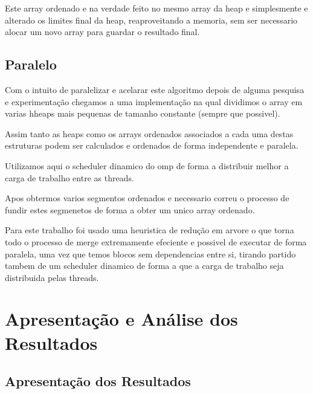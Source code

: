 \documentclass{article}
\begin{document}
\par Este array ordenado e na verdade feito no mesmo array da heap e simplesmente e alterado os limites final da heap, reaproveitando a memoria, sem ser necessario alocar um novo array para guardar o resultado final.


\subsection{Paralelo}
Com o intuito de paralelizar e acelarar este algoritmo depois de alguma pesquisa e experimentação chegamos a uma implementação na qual dividimos o array em varias hheaps mais pequenas de tamanho constante (sempre que possivel). 
\par Assim tanto as heaps como os arrays ordenados associados a cada uma destas estruturas podem ser calculados e ordenados de forma independente e paralela. 
\par Utilizamos aqui o scheduler dinamico do omp de forma a distribuir melhor a carga de trabalho entre as threads. 
\par Apos obtermos varios segmentos ordenados e necessario correu o processo de fundir estes segmenetos de forma a obter um unico array ordenado. 
\par Para este trabalho foi usado uma heuristica de redução em arvore o que torna todo o processo de merge extremamente efeciente e possivel de executar de forma paralela, uma vez que temos blocos sem dependencias entre si, tirando partido tambem de um scheduler dinamico de forma a que a carga de trabalho seja distribuida pelas threads.

\section{Apresentação e Análise dos Resultados}
\subsection{Apresentação dos Resultados}
\end{document}
